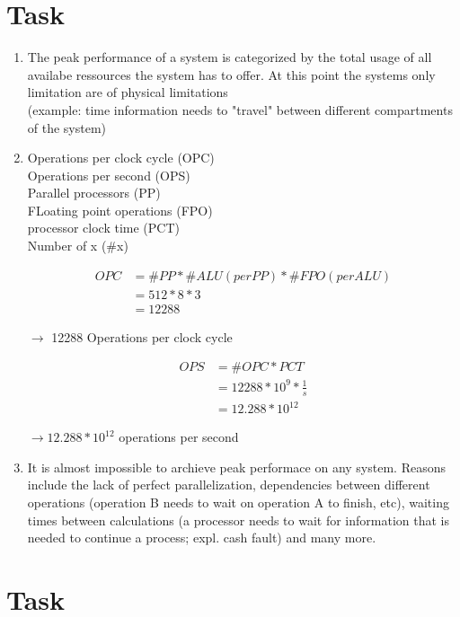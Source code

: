 \documentclass{article}
\begin{document}
\section{Task}

\begin{enumerate}[label=(\alph*)]


\item The peak performance of a system is categorized by the total usage of all availabe ressources
the system has to offer. At this point the systems only limitation are of physical limitations\\
(example: time information needs to "travel" between different compartments of the system)


\item Operations per clock cycle (OPC)\\
Operations per second (OPS)\\
Parallel processors (PP)\\
FLoating point operations (FPO)\\
processor clock time (PCT)\\
Number of x (\#x)

\begin{align*}
	OPC &= \#PP * \#ALU(per PP) * \#FPO(per ALU)\\
	    &= 512 *     8	 *     3 \\
	    &= 12288
\end{align*}


$\rightarrow$ 12288 Operations per clock cycle

\begin{align*}
	OPS &= \#OPC * PCT \\
	&= 12288 * 10^{9} * \frac{1}{s} \\
	&= 12.288*10^{12}
\end{align*}

$\rightarrow 12.288*10^{12}$ operations per second


\item It is almost impossible to archieve peak performace on any system. Reasons include the lack of
perfect parallelization, dependencies between different operations (operation B needs to wait
on operation A to finish, etc), waiting times between calculations (a processor needs to wait
for information that is needed to continue a process; expl. cash fault) and many more.
\end{enumerate}

\section{Task}
\end{document}
